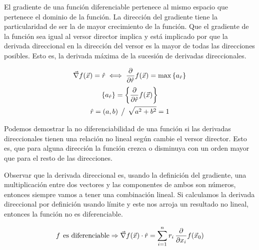 El gradiente de una función diferenciable pertenece al mismo espacio que pertenece el dominio de la función.
La dirección del gradiente tiene la particularidad de ser la de mayor crecimiento de la función.
Que el gradiente de la función sea igual al versor director implica y está implicado por que la derivada direccional en la dirección del versor es la mayor de todas las direcciones posibles.
Esto es, la derivada máxima de la sucesión de derivadas direccionales.

\begin{mdframed}[style=PropertyFrame]
    \begin{prop}
    \end{prop}
    \begin{equation*}
        \Vec{\nabla} f(\Vec{x}) = \hat{r} \iff \frac{\partial}{\partial \hat{r}} f(\Vec{x}) = \operatorname{max} { \left\{ { a_{\hat{r}} } \right\} }
    \end{equation*}
    \begin{gather*}
        { \left\{ { a_{\hat{r}} } \right\} } = { \left\{ { \frac{\partial}{\partial \hat{r}} f(\Vec{x}) } \right\} }
        \\
        \hat{r} = (a,b) \hspace{1ex} \big/ \hspace{1ex} \sqrt{a^2 + b^2}=1
    \end{gather*}
\end{mdframed}

Podemos demostrar la no diferenciabilidad de una función si las derivadas direccionales tienen una relación no lineal según cambie el versor director.
Esto es, que para alguna dirección la función crezca o disminuya con un orden mayor que para el resto de las direcciones.

Observar que la derivada direccional es, usando la definición del gradiente, una multiplicación entre dos vectores y las componentes de ambos son números, entonces siempre vamos a tener una combinación lineal.
Si calculamos la derivada direccional por definición usando límite y este nos arroja un resultado no lineal, entonces la función no es diferenciable.

\begin{mdframed}[style=PropertyFrame]
    \begin{prop}
    \end{prop}
    \begin{equation*}
        f \hspace{1ex} \textrm{es diferenciable} \Rightarrow \Vec{\nabla} f(\Vec{x}) \cdot \hat{r} = \sum_{i=1}^n r_i \, \frac{\partial}{\partial x_i} f(\Vec{x}_0)
    \end{equation*}
\end{mdframed}

